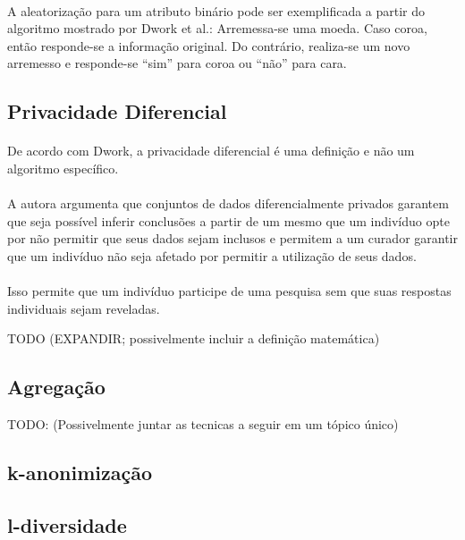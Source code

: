 \paragraph{} A aleatorização para um atributo binário pode ser exemplificada a partir do algoritmo mostrado por Dwork et al.\cite{dwork2014algorithmic}: Arremessa-se uma moeda. Caso coroa, então responde-se a informação original. Do contrário, realiza-se um novo arremesso e responde-se ``sim'' para coroa ou ``não'' para cara.

\subsection{Privacidade Diferencial}

\paragraph{} De acordo com Dwork\cite{dwork2008differential}, a privacidade diferencial é uma definição e não um algoritmo específico. 

\paragraph{} A autora argumenta que conjuntos de dados diferencialmente privados garantem que seja possível inferir conclusões a partir de um mesmo que um indivíduo opte por não permitir que seus dados sejam inclusos e permitem a um curador garantir que um indivíduo não seja afetado por permitir a utilização de seus dados.

\paragraph{} Isso permite que um indivíduo participe de uma pesquisa sem que suas respostas individuais sejam reveladas.

TODO (EXPANDIR; possivelmente incluir a definição matemática)


\subsection{Agregação}
TODO: (Possivelmente juntar as tecnicas a seguir em um tópico único)

\subsection{k-anonimização}

\subsection{l-diversidade}

